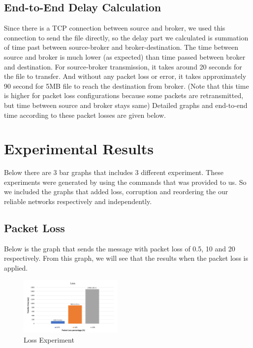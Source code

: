 \documentclass[conference]{IEEEtran}
\begin{document}
\subsection{End-to-End Delay Calculation}

Since there is a TCP connection between source and broker, we used this connection to send the file directly, so the delay part we calculated is summation of time past between source-broker and broker-destination. The time between source and broker is much lower (as expected) than time passed between broker and destination. For source-broker transmission, it takes around 20 seconds for the file to transfer. And without any packet loss or error, it takes approximately 90 second for 5MB file to reach the destination from broker. (Note that this time is higher for packet loss configurations because some packets are retransmitted, but time between source and broker stays same) Detailed graphs and end-to-end time according to these packet losses are given below. 

\section{Experimental Results}

Below there are 3 bar graphs that includes 3 different experiment. These experiments were generated by using the commands that was provided to us. So we included the graphs that added loss, corruption and reordering the our reliable networks respectively and independently.


\subsection{Packet Loss}

Below is the graph that sends the message with packet loss of 0.5, 10 and 20 respectively. From this graph, we will see that the results when the packet loss is applied.

\begin{figure}[h]
\includegraphics[width=0.45\textwidth]{Loss.png}
\caption{Loss Experiment}
\label{fig:figure2}
\end{figure}
\end{document}
